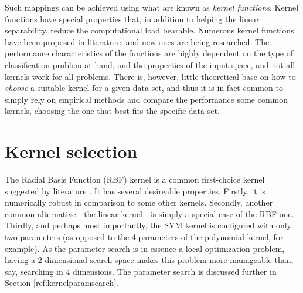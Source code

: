 \documentclass{netsec2012}
\begin{document}
Such mappings can be achieved using what are known as \emph{kernel functions}.  Kernel functions
have special properties that, in addition to helping the linear separability, reduce the
computational load bearable.  Numerous kernel functions have been proposed in literature, and new
ones are being researched.  The performance characteristics of the functions are highly dependent on
the type of classification problem at hand, and the properties of the input space, and not all
kernels work for all problems.  There is, however, little theoretical base on how to \emph{choose} a
suitable kernel for a given data set, and thus it is in fact common to simply rely on empirical
methods and compare the performance some common kernels, choosing the one that best fits the
specific data set.

%
%
%

\section{Kernel selection}


The Radial Basis Function (RBF) kernel is a common first-choice kernel suggested by literature
\cite{libsvm_guide,svm_chemistry}. It has several desireable properties.  Firstly, it is numerically
robust in comparison to some other kernels.  Secondly, another common alternative - the linear
kernel - is simply a special case of the RBF one.  Thirdly, and perhaps most importantly, the SVM
kernel is configured with only two parameters (as opposed to the 4 parameters of the polynomial
kernel, for example).  As the parameter search is in essence a local optimization problem, having a
2-dimensional search space makes this problem more manageable than, say, searching in 4 dimensions.
The parameter search is discussed further in Section \ref{ref:kernelparamsearch}.
\end{document}
